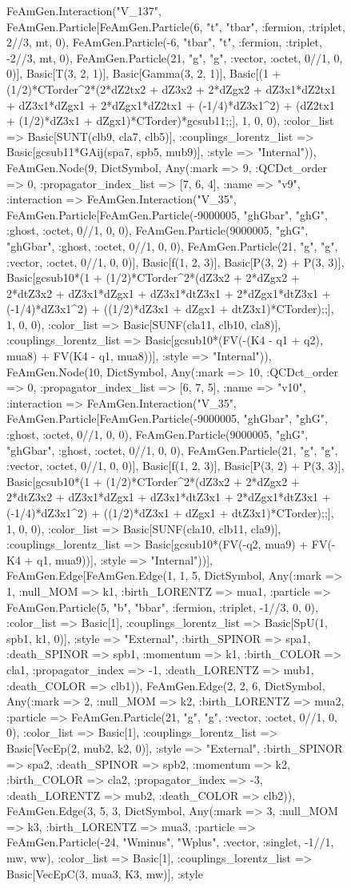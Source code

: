 \documentclass{revtex4}
\begin{document}
\begin{figure}[!htb]
\begin{center}
{FeAmGen.Interaction("V_137", FeAmGen.Particle[FeAmGen.Particle(6, "t", "tbar", :fermion, :triplet, 2//3, mt, 0), FeAmGen.Particle(-6, "tbar", "t", :fermion, :triplet, -2//3, mt, 0), FeAmGen.Particle(21, "g", "g", :vector, :octet, 0//1, 0, 0)], Basic[T(3, 2, 1)], Basic[Gamma(3, 2, 1)], Basic[(1 + (1/2)*CTorder^2*(2*dZ2tx2 + dZ3x2 + 2*dZgx2 + dZ3x1*dZ2tx1 + dZ3x1*dZgx1 + 2*dZgx1*dZ2tx1 + (-1/4)*dZ3x1^2) + (dZ2tx1 + (1/2)*dZ3x1 + dZgx1)*CTorder)*gcsub11;;], 1, 0, 0), :color_list => Basic[SUNT(clb9, cla7, clb5)], :couplings_lorentz_list => Basic[gcsub11*GAij(spa7, spb5, mub9)], :style => "Internal")), FeAmGen.Node(9, Dict{Symbol, Any}(:mark => 9, :QCDct_order => 0, :propagator_index_list => [7, 6, 4], :name => "v9", :interaction => FeAmGen.Interaction("V_35", FeAmGen.Particle[FeAmGen.Particle(-9000005, "ghGbar", "ghG", :ghost, :octet, 0//1, 0, 0), FeAmGen.Particle(9000005, "ghG", "ghGbar", :ghost, :octet, 0//1, 0, 0), FeAmGen.Particle(21, "g", "g", :vector, :octet, 0//1, 0, 0)], Basic[f(1, 2, 3)], Basic[P(3, 2) + P(3, 3)], Basic[gcsub10*(1 + (1/2)*CTorder^2*(dZ3x2 + 2*dZgx2 + 2*dtZ3x2 + dZ3x1*dZgx1 + dZ3x1*dtZ3x1 + 2*dZgx1*dtZ3x1 + (-1/4)*dZ3x1^2) + ((1/2)*dZ3x1 + dZgx1 + dtZ3x1)*CTorder);;], 1, 0, 0), :color_list => Basic[SUNF(cla11, clb10, cla8)], :couplings_lorentz_list => Basic[gcsub10*(FV(-(K4 - q1 + q2), mua8) + FV(K4 - q1, mua8))], :style => "Internal")), FeAmGen.Node(10, Dict{Symbol, Any}(:mark => 10, :QCDct_order => 0, :propagator_index_list => [6, 7, 5], :name => "v10", :interaction => FeAmGen.Interaction("V_35", FeAmGen.Particle[FeAmGen.Particle(-9000005, "ghGbar", "ghG", :ghost, :octet, 0//1, 0, 0), FeAmGen.Particle(9000005, "ghG", "ghGbar", :ghost, :octet, 0//1, 0, 0), FeAmGen.Particle(21, "g", "g", :vector, :octet, 0//1, 0, 0)], Basic[f(1, 2, 3)], Basic[P(3, 2) + P(3, 3)], Basic[gcsub10*(1 + (1/2)*CTorder^2*(dZ3x2 + 2*dZgx2 + 2*dtZ3x2 + dZ3x1*dZgx1 + dZ3x1*dtZ3x1 + 2*dZgx1*dtZ3x1 + (-1/4)*dZ3x1^2) + ((1/2)*dZ3x1 + dZgx1 + dtZ3x1)*CTorder);;], 1, 0, 0), :color_list => Basic[SUNF(cla10, clb11, cla9)], :couplings_lorentz_list => Basic[gcsub10*(FV(-q2, mua9) + FV(-K4 + q1, mua9))], :style => "Internal"))], FeAmGen.Edge[FeAmGen.Edge(1, 1, 5, Dict{Symbol, Any}(:mark => 1, :null_MOM => k1, :birth_LORENTZ => mua1, :particle => FeAmGen.Particle(5, "b", "bbar", :fermion, :triplet, -1//3, 0, 0), :color_list => Basic[1], :couplings_lorentz_list => Basic[SpU(1, spb1, k1, 0)], :style => "External", :birth_SPINOR => spa1, :death_SPINOR => spb1, :momentum => k1, :birth_COLOR => cla1, :propagator_index => -1, :death_LORENTZ => mub1, :death_COLOR => clb1)), FeAmGen.Edge(2, 2, 6, Dict{Symbol, Any}(:mark => 2, :null_MOM => k2, :birth_LORENTZ => mua2, :particle => FeAmGen.Particle(21, "g", "g", :vector, :octet, 0//1, 0, 0), :color_list => Basic[1], :couplings_lorentz_list => Basic[VecEp(2, mub2, k2, 0)], :style => "External", :birth_SPINOR => spa2, :death_SPINOR => spb2, :momentum => k2, :birth_COLOR => cla2, :propagator_index => -3, :death_LORENTZ => mub2, :death_COLOR => clb2)), FeAmGen.Edge(3, 5, 3, Dict{Symbol, Any}(:mark => 3, :null_MOM => k3, :birth_LORENTZ => mua3, :particle => FeAmGen.Particle(-24, "Wminus", "Wplus", :vector, :singlet, -1//1, mw, ww), :color_list => Basic[1], :couplings_lorentz_list => Basic[VecEpC(3, mua3, K3, mw)], :style }
\end{center}
\end{figure}
\end{document}
